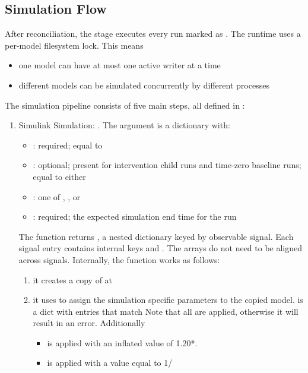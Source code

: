 \documentclass[11pt]{article}
\begin{document}
\subsection*{Simulation Flow}

After reconciliation, the stage executes every run marked as . The runtime uses a per-model filesystem lock. This means
\begin{itemize}
\item one model can have at most one active writer at a time
\item different models can be simulated concurrently by different processes
\end{itemize}

The simulation pipeline consists of five main steps, all defined in : 
\begin{enumerate}
\item Simulink Simulation: .
The  argument is a dictionary with:
  \begin{itemize}
  \item {}: required; equal to 
  \item {}: optional; present for intervention child runs and time-zero baseline runs; equal to either 
  \item {}: one of , , or 
  \item {}: required; the expected simulation end time for the run
  \end{itemize}

The function returns , a nested dictionary keyed by observable signal. Each signal entry contains internal keys  and . The  arrays do not need to be aligned across signals.
Internally, the function works as follows:
\begin{enumerate}
\item it creates a copy of  at 
\item it uses  to assign the simulation specific parameters to the copied model.  is a dict with entries that match 
Note that all  are applied, otherwise it will result in an error. Additionally 
\begin{itemize}
  \item {} is applied  with an inflated value of 1.20*.
  \item {} is applied with a value equal to  1/
\end{itemize}


\end{enumerate}
\end{enumerate}
\end{document}
